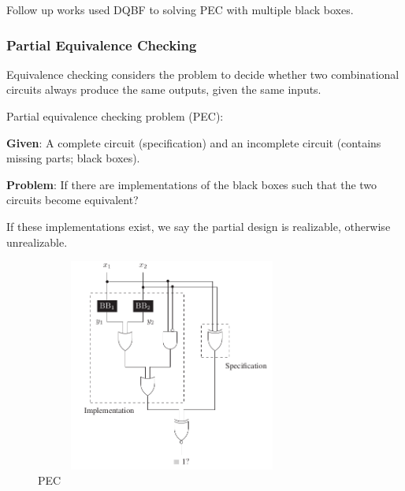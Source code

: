 \documentclass[runningheads]{llncs}
\begin{document}
Follow up works \cite{gitinarswb13, gitinarswb13r, wimmerws018} used DQBF to solving PEC with multiple black boxes.

\subsubsection{Partial Equivalence Checking}\label{sssec:pec}
Equivalence checking considers the problem to decide whether
two combinational circuits always produce the same outputs,
given the same inputs.

Partial equivalence checking problem (PEC):
\par\textbf{Given}: A complete circuit (specification) and an incomplete circuit (contains missing parts; black boxes).
\par\textbf{Problem}: If there are implementations of the black boxes such that the two circuits become equivalent?

If these implementations exist, we say the partial design is realizable, otherwise unrealizable.

\begin{figure}[]
	\includegraphics[width=9cm, height=7cm]{pec}
	\centering 
	\caption{PEC}\label{fig:pec}
\end{figure}
\end{document}
